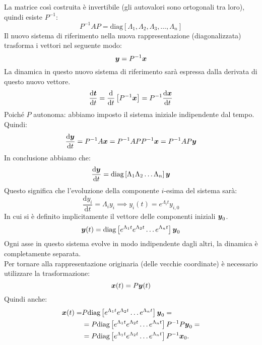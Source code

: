 La matrice così costruita è invertibile (gli autovalori sono ortogonali tra loro), quindi esiste $P^{-1}$: 
\[
    P^{-1}AP = \text{diag}\left[\Lambda_1, \Lambda_2, \Lambda_3, \ldots, \Lambda_n\right]
\] 
Il nuovo sistema di riferimento nella nuova rappresentazione (diagonalizzata) trasforma i vettori nel seguente modo:
\[
    \boldsymbol{y} = P^{-1}\boldsymbol{x}
\] 
La dinamica in questo nuovo sistema di riferimento sarà espressa dalla derivata di questo nuovo vettore.
\[
    \frac{\text{d} \boldsymbol{t}}{\text{d} t} = \frac{\text{d} }{\text{d} t} \left[P^{-1}\boldsymbol{x}\right] = 
    P^{-1}\frac{\text{d} \boldsymbol{x}}{\text{d} t} 
\] 
Poiché $P$  autonoma: abbiamo imposto il sistema iniziale indipendente dal tempo. Quindi:
\[
    \frac{\text{d} \boldsymbol{y}}{\text{d} t} = P^{-1}A\boldsymbol{x}  = P^{-1}APP^{-1}\boldsymbol{x}  = P^{-1}AP \boldsymbol{y}
\] 
In conclusione abbiamo che:
\[
    \frac{\text{d} \boldsymbol{y}}{\text{d} t} = \text{diag}\left[\Lambda_1\Lambda_2\ldots\Lambda_n\right]\boldsymbol{y}
\] 
Questo significa che l'evoluzione della componente $i$-esima del sistema sarà:
\[
    \frac{\text{d} y_i}{\text{d} t} = \Lambda_i y_i \implies  y_i(t)=e^{\Lambda_i t}y_{i, 0}
\] 
In cui si è definito implicitamente il vettore delle componenti iniziali $\boldsymbol{y}_0$. 
\[
    \boldsymbol{y} (t)= \text{diag}\left[e^{\Lambda_1t}e^{\Lambda_2t}\ldots e^{\Lambda_nt}\right]\boldsymbol{y}_0
\] 
Ogni asse in questo sistema evolve in modo indipendente dagli altri, la dinamica è completamente separata.\\
Per tornare alla rappresentazione originaria (delle vecchie coordinate) è necessario utilizzare la trasformazione:
\[
    \boldsymbol{x} (t)= P \boldsymbol{y} (t)
\] 
Quindi anche:
\[\begin{aligned}
    \boldsymbol{x} (t)=& P \text{diag}\left[e^{\Lambda_1 t}e^{\Lambda_2t}\ldots e^{\Lambda_nt}\right]\boldsymbol{y}_0 = \\
		 &=P \text{diag}\left[e^{\Lambda_1t}e^{\Lambda_2t}\ldots e^{\Lambda_nt}\right]P^{-1}P\boldsymbol{y}_0 = \\
		 &=P \text{diag}\left[e^{\Lambda_1t}e^{\Lambda_2t}\ldots e^{\Lambda_nt}\right]P^{-1}\boldsymbol{x}_0
.\end{aligned}\]
